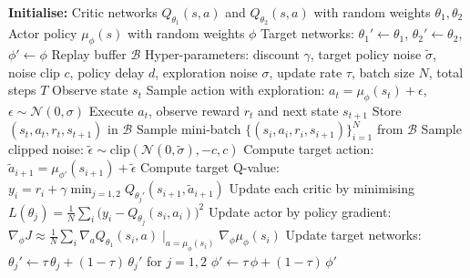 \begin{algorithmic}
\State \textbf{Initialise:}
\State \quad Critic networks $Q_{\theta_1}(s,a)$ and $Q_{\theta_2}(s,a)$ with random weights $\theta_1,\theta_2$
\State \quad Actor policy $\mu_{\phi}(s)$ with random weights $\phi$
\State \quad Target networks: $\theta_1' \leftarrow \theta_1$, $\theta_2' \leftarrow \theta_2$, $\phi' \leftarrow \phi$
\State \quad Replay buffer $\mathcal{B}$
\State \quad Hyper-parameters: discount $\gamma$, target policy noise $\tilde{\sigma}$, noise clip $c$, policy delay $d$, exploration noise $\sigma$, update rate $\tau$, batch size $N$, total steps $T$
    \State Observe state $s_t$
    \State Sample action with exploration: $a_t = \mu_{\phi}(s_t) + \epsilon$, $\epsilon \sim \mathcal{N}(0,\sigma)$
    \State Execute $a_t$, observe reward $r_t$ and next state $s_{t+1}$
    \State Store $(s_t, a_t, r_t, s_{t+1})$ in $\mathcal{B}$
    \State Sample mini-batch $\{(s_i,a_i,r_i,s_{i+1})\}_{i=1}^N$ from $\mathcal{B}$
    \State \quad Sample clipped noise: $\tilde{\epsilon} \sim \mathrm{clip}(\mathcal{N}(0,\tilde{\sigma}), -c, c)$
    \State \quad Compute target action: $\tilde{a}_{i+1} = \mu_{\phi'}(s_{i+1}) + \tilde{\epsilon}$
    \State \quad Compute target Q-value:
        $y_i = r_i + \gamma \min_{j=1,2} Q_{\theta_j'}(s_{i+1}, \tilde{a}_{i+1})$
    \State \quad Update each critic by minimising
        $L(\theta_j) = \frac{1}{N}\sum_i \bigl(y_i - Q_{\theta_j}(s_i,a_i)\bigr)^2$
        \State Update actor by policy gradient: $\nabla_{\phi} J \approx \frac{1}{N}\sum_i \nabla_a Q_{\theta_1}(s_i,a)\mid_{a=\mu_{\phi}(s_i)} \nabla_{\phi} \mu_{\phi}(s_i)$
        \State Update target networks:
        \State \quad $\theta_j' \leftarrow \tau\,\theta_j + (1-\tau)\,\theta_j'$ for $j=1,2$
        \State \quad $\phi' \leftarrow \tau\,\phi + (1-\tau)\,\phi'$
    \EndIf
\EndFor
\end{algorithmic}
